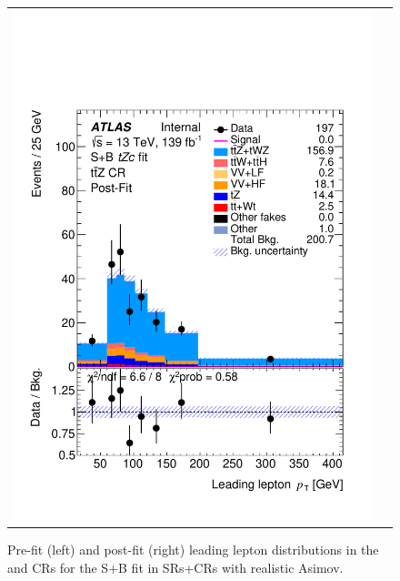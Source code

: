 \begin{figure}[htbp]
\begin{tabular}{cc}
		\includegraphics[width=.45\textwidth]{Chapters/CH8/figures/SPLUSB_CRSR_UsingDL1rcFullSys/Plots/TTZCR_postFit} \\
	\end{tabular}
	\caption{Pre-fit (left) and post-fit (right) leading lepton \pt distributions in the \ttbar and \ttZ CRs for the S+B \tZc fit in SRs+CRs with realistic Asimov.
		\ErrStatSys
	}%
	\label{fig:stat:tzc:splusb:crsr:crplots:2}
\end{figure}

\clearpage
